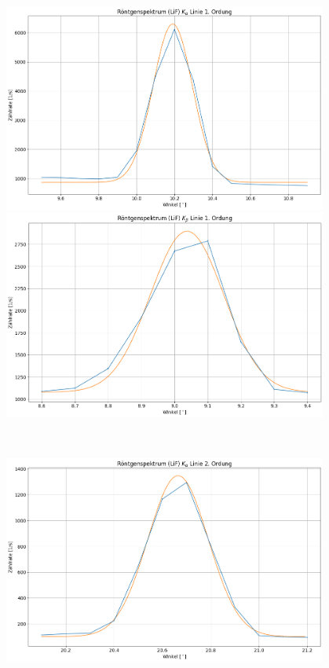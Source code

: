 \begin{figure}[H]
  \centering
  \begin{minipage}{0.5\textwidth}
      \centering
      \includegraphics[width=0.95\textwidth]{files/plots/lif_kalpha_1ord.png}
  \end{minipage}\hfill
  \begin{minipage}{0.5\textwidth}
      \centering
      \includegraphics[width=0.95\textwidth]{files/plots/lif_kbeta_1ord.png}
  \end{minipage}\\
  \begin{minipage}{0.5\textwidth}
    \centering
    \includegraphics[width=0.95\textwidth]{files/plots/lif_kalpha_2ord.png}

\end{minipage}
\end{figure}
